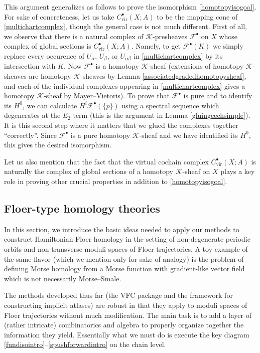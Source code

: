 \documentclass[12pt]{article}
\theoremstyle{definition}
\theoremstyle{remark}
\numberwithin{equation}{subsection}
\newcommand{\F}{\mathcal F}
\newcommand{\K}{\mathcal K}
\newcommand{\vir}{\mathrm{vir}}
\begin{document}
This argument generalizes as follows to prove the isomorphism \eqref{homotopyisogoal}.  For sake of concreteness, let us take $C^\bullet_\vir(X;A)$ to be the mapping cone of \eqref{multichartcomplex}, though the general case is not much different.  First of all, we observe that there is a natural complex of $\K$-presheaves $\F^\bullet$ on $X$ whose complex of global sections is $C^\bullet_\vir(X;A)$.  Namely, to get $\F^\bullet(K)$ we simply replace every occurence of $U_\alpha$, $U_\beta$, or $U_{\alpha\beta}$ in \eqref{multichartcomplex} by its intersection with $K$.  Now $\F^\bullet$ is a homotopy $\K$-sheaf (extensions of homotopy $\K$-sheaves are homotopy $\K$-sheaves by Lemma \ref{associatedgradedhomotopysheaf}, and each of the individual complexes appearing in \eqref{multichartcomplex} gives a homotopy $\K$-sheaf by Mayer--Vietoris).  To prove that $\F^\bullet$ is pure and to identify its $H^0$, we can calculate $H^i\F^\bullet(\{p\})$ using a spectral sequence which degenerates at the $E_2$ term (this is the argument in Lemma \ref{gluingcechsimple}).  It is this second step where it matters that we glued the complexes together ``correctly''.  Since $\F^\bullet$ is a pure homotopy $\K$-sheaf and we have identified its $H^0$, this gives the desired isomorphism.

Let us also mention that the fact that the virtual cochain complex $C^\bullet_\vir(X;A)$ is naturally the complex of global sections of a homotopy $\K$-sheaf on $X$ plays a key role in proving other crucial properties in addition to \eqref{homotopyisogoal}.

\subsection{Floer-type homology theories}\label{floerintrosection}

In this section, we introduce the basic ideas needed to apply our methods to construct Hamiltonian Floer homology in the setting of non-degenerate periodic orbits and non-transverse moduli spaces of Floer trajectories.  A toy example of the same flavor (which we mention only for sake of analogy) is the problem of defining Morse homology from a Morse function with gradient-like vector field which is not necessarily Morse--Smale.

The methods developed thus far (the VFC package and the framework for constructing implicit atlases) are robust in that they apply to moduli spaces of Floer trajectories without much modification.  The main task is to add a layer of (rather intricate) combinatorics and algebra to properly organize together the information they yield.  Essentially what we must do is execute the key diagram \eqref{fundisointro}--\eqref{spushforwardintro} on the chain level.
\end{document}
